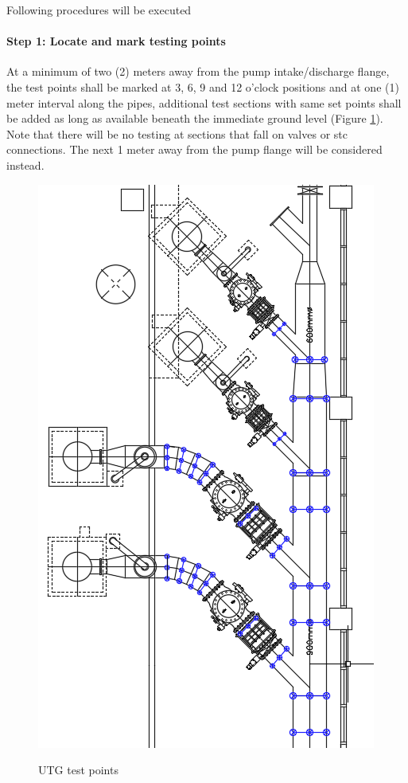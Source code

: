 Following procedures will be executed

\paragraph{Step 1: Locate and mark testing points}
At a minimum of two (2) meters away from the pump intake/discharge flange, the test points shall be marked at 3, 6, 9 and 12 o’clock positions and at one (1) meter interval along the pipes, additional test sections with same set points shall be added as long as available beneath the immediate ground level (Figure \ref{fig_ch02_utg}). Note that there will be no testing at sections that fall on valves or stc connections. The next 1 meter away from the pump flange will be considered instead.

\begin{figure}[!htb]
	\includegraphics[scale=0.7, angle=90]{figures/fig_ch02_utg} \\
	\caption{UTG test points}
	\label{fig_ch02_utg} 
\end{figure}

